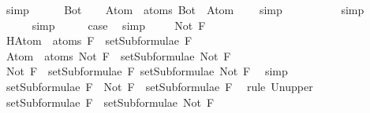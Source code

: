 \begin{isabellebody}
\ simp\ \ \isanewline
{}\isamarkupfalse%
\isanewline
\ \ \isamarkupfalse%
\ Bot\isanewline
\ \ \isamarkupfalse%
\ {\isachardoublequoteopen}Atom\ {\isacharbackquote}\ atoms\ {\isacharparenleft}Bot{\isacharparenright}\ {\isacharequal}\ Atom\ {\isacharbackquote}\ {\isacharbraceleft}{\isacharbraceright}{\isachardoublequoteclose}\ \isamarkupfalse%
\ simp\isanewline
\ \ \isamarkupfalse%
\ \isamarkupfalse%
\ {\isachardoublequoteopen}{\isasymdots}\ {\isacharequal}\ {\isacharbraceleft}{\isacharbraceright}{\isachardoublequoteclose}\ \isamarkupfalse%
\ simp\isanewline
\ \ \isamarkupfalse%
\ \isamarkupfalse%
\ {\isachardoublequoteopen}{\isasymdots}\ {\isasymsubseteq}\ {\isacharbraceleft}{\isacharbraceright}{\isachardoublequoteclose}\ \isamarkupfalse%
\ simp\isanewline
\ \ \isamarkupfalse%
\ \isamarkupfalse%
\ {\isacharquery}case\ \isamarkupfalse%
\ simp\ \isanewline
{}\isamarkupfalse%
\isanewline
\ \ \isamarkupfalse%
\ {\isacharparenleft}Not\ F{\isacharparenright}\isanewline
\ \ \isamarkupfalse%
\ H{\isacharcolon}{\isachardoublequoteopen}Atom\ {\isacharbackquote}\ atoms\ F\ {\isasymsubseteq}\ setSubformulae\ F{\isachardoublequoteclose}\isanewline
\ \ \isamarkupfalse%
\ {\isachardoublequoteopen}Atom\ {\isacharbackquote}\ atoms\ {\isacharparenleft}Not\ F{\isacharparenright}\ {\isasymsubseteq}\ setSubformulae\ {\isacharparenleft}Not\ F{\isacharparenright}{\isachardoublequoteclose}\isanewline
\ \ \isamarkupfalse%
\ {\isacharminus}\isanewline
\ \ \ \ \isamarkupfalse%
\ {\isachardoublequoteopen}{\isacharbraceleft}Not\ F{\isacharbraceright}\ {\isasymunion}\ setSubformulae\ F{\isacharequal}\ setSubformulae\ {\isacharparenleft}Not\ F{\isacharparenright}{\isachardoublequoteclose}\ \isamarkupfalse%
\ simp\isanewline
\ \ \ \ \isamarkupfalse%
\ {\isachardoublequoteopen}setSubformulae\ F\ {\isasymsubseteq}\ {\isacharbraceleft}Not\ F{\isacharbraceright}\ {\isasymunion}\ setSubformulae\ F{\isachardoublequoteclose}\ \isamarkupfalse%
\ {\isacharparenleft}rule\ Un{\isacharunderscore}upper{}{\isacharparenright}\isanewline
\ \ \ \ \isamarkupfalse%
\ \isamarkupfalse%
\ {}{\isacharcolon}{\isachardoublequoteopen}setSubformulae\ F\ {\isasymsubseteq}\ setSubformulae\ {\isacharparenleft}Not\ F{\isacharparenright}{\isachardoublequoteclose}\ \isamarkupfalse%

\end{isabellebody}
